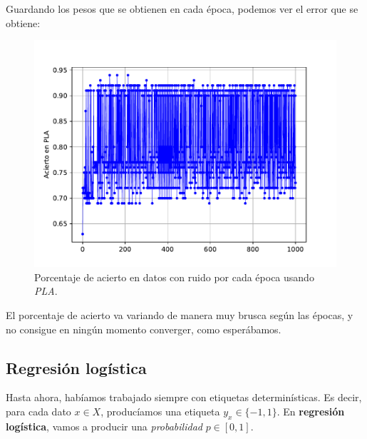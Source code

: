 \documentclass[12pt]{article}
\begin{document}
{Guardando los pesos que se obtienen en cada época, podemos ver el error que se obtiene:

\begin{figure}[H]
  \centering
  \includegraphics[scale = 0.6]{media/PLA-ruido.pdf}
  \caption{Porcentaje de acierto en datos con ruido por cada época usando \emph{PLA}.}
\end{figure}
El porcentaje de acierto va variando de manera muy brusca según las épocas, y no consigue en ningún momento converger, como esperábamos.

\subsection*{Regresión logística}

Hasta ahora, habíamos trabajado siempre con etiquetas determinísticas. Es decir, para cada dato $x\in X$, producíamos una etiqueta $y_x \in \{-1,1\}$. En \textbf{regresión logística}, vamos a producir una \emph{probabilidad} $p \in [0,1]$.

}
\end{document}

